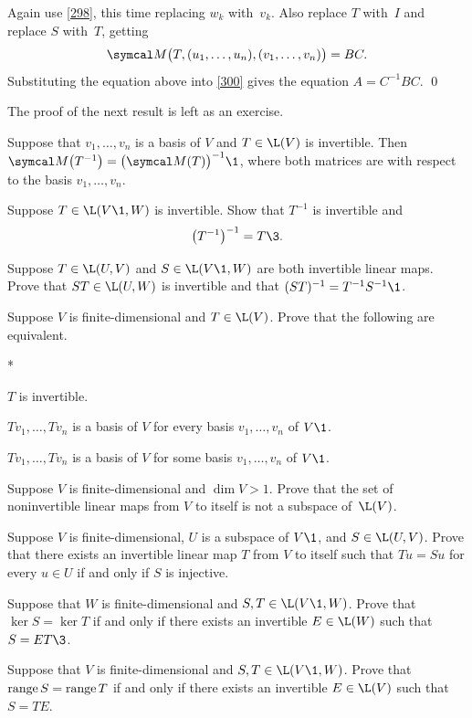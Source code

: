 Again use \ref{298}, this time replacing
$w_k$ with~$v_k$. Also replace $T$
with~$I$ and replace $S$ with~$T$, getting
\[
\M\bigl(T, (u_1, \dots, u_n), (v_1, \dots, v_n) \bigr) = B C.
\]
Substituting the equation above into \ref{300} gives the equation $A = C^{-1}B C$.
\qed

The proof of the next result is left as an exercise.

{Suppose that $v_1, \ldots, v_n$ is a basis of $V$ and $T \in \L(V)$ is invertible. Then
$
\M\bigl(T^{-1}\bigr) = \paren[\big]{\M(T)}^{-1}\1$,
where both matrices are with respect to the basis $v_1, \ldots, v_n$.}

\begin{exercises}

\exercise
Suppose $T \in \L(V\1, W)$ is invertible. Show that $T^{-1}$ is invertible and
\[
\paren[\big]{ T^{-1} }^{-1} = T\3.
\]
\exercisedisplayend


\exercise
Suppose $T \in \L(U, V)$ and $S \in \L(V\1,W)$ are both invertible linear maps. Prove that $ST \in \L(U, W)$ is invertible and that $(ST)^{-1} = T^{-1} S^{-1}\1$.


\exercise
Suppose $V$ is finite-dimensional and $T \in \L(V)$. Prove that the following are equivalent.
\begin{subtheorem}*
\item
$T$ is invertible.
\item
$Tv_1, \ldots, Tv_n$ is a basis of $V$ for every basis $v_1, \ldots, v_n$ of $V\1$.
\item
$Tv_1, \ldots, Tv_n$ is a basis of $V$ for some basis $v_1, \ldots, v_n$ of $V\1$.
\end{subtheorem}
\exercisesubtheoremend


\exercise
Suppose $V$ is finite-dimensional and $\dim V > 1$. Prove that the set of
noninvertible linear maps from $V$ to itself is  not a subspace of~$\L(V)$.


\exercise
Suppose $V$ is finite-dimensional, $U$ is a subspace of $V\1$, and $S \in \L(U, V)$. Prove that there exists an invertible linear map $T$ from $V$ to itself such that $Tu = Su$ for every $u \in U$ if and only if $S$ is injective.\label{3inv}


\exercise
Suppose that $W$ is finite-dimensional and $S, T \in \L(V\1, W)$. Prove that
$
\ker S = \ker T$
if and only if there exists an invertible \mbox{$E \in \L(W)$} such that $S = ET\3$. \label{1020}


\exercise
Suppose that $V$ is finite-dimensional and $S, T \in \L(V\1, W)$. Prove that
$
\operatorname{range} S = \operatorname{range} T
$
if and only if there exists an invertible $E \in \L(V)$ such that $S = T E$.



\end{exercises}
